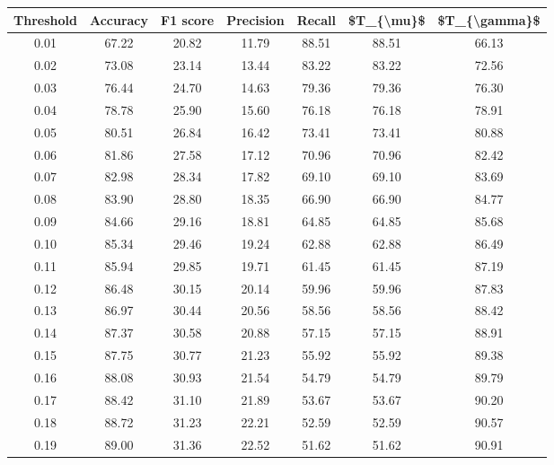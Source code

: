 \begin{tabular}{|c|c|c|c|c|c|c|}
\hline
 Threshold &  Accuracy &  F1 score &  Precision &  Recall &  \$T\_\{\textbackslash mu\}\$ &  \$T\_\{\textbackslash gamma\}\$ \\
\hline
      0.01 &     67.22 &     20.82 &      11.79 &   88.51 &      88.51 &         66.13 \\
      0.02 &     73.08 &     23.14 &      13.44 &   83.22 &      83.22 &         72.56 \\
      0.03 &     76.44 &     24.70 &      14.63 &   79.36 &      79.36 &         76.30 \\
      0.04 &     78.78 &     25.90 &      15.60 &   76.18 &      76.18 &         78.91 \\
      0.05 &     80.51 &     26.84 &      16.42 &   73.41 &      73.41 &         80.88 \\
      0.06 &     81.86 &     27.58 &      17.12 &   70.96 &      70.96 &         82.42 \\
      0.07 &     82.98 &     28.34 &      17.82 &   69.10 &      69.10 &         83.69 \\
      0.08 &     83.90 &     28.80 &      18.35 &   66.90 &      66.90 &         84.77 \\
      0.09 &     84.66 &     29.16 &      18.81 &   64.85 &      64.85 &         85.68 \\
      0.10 &     85.34 &     29.46 &      19.24 &   62.88 &      62.88 &         86.49 \\
      0.11 &     85.94 &     29.85 &      19.71 &   61.45 &      61.45 &         87.19 \\
      0.12 &     86.48 &     30.15 &      20.14 &   59.96 &      59.96 &         87.83 \\
      0.13 &     86.97 &     30.44 &      20.56 &   58.56 &      58.56 &         88.42 \\
      0.14 &     87.37 &     30.58 &      20.88 &   57.15 &      57.15 &         88.91 \\
      0.15 &     87.75 &     30.77 &      21.23 &   55.92 &      55.92 &         89.38 \\
      0.16 &     88.08 &     30.93 &      21.54 &   54.79 &      54.79 &         89.79 \\
      0.17 &     88.42 &     31.10 &      21.89 &   53.67 &      53.67 &         90.20 \\
      0.18 &     88.72 &     31.23 &      22.21 &   52.59 &      52.59 &         90.57 \\
      0.19 &     89.00 &     31.36 &      22.52 &   51.62 &      51.62 &         90.91 \\

\end{tabular}
